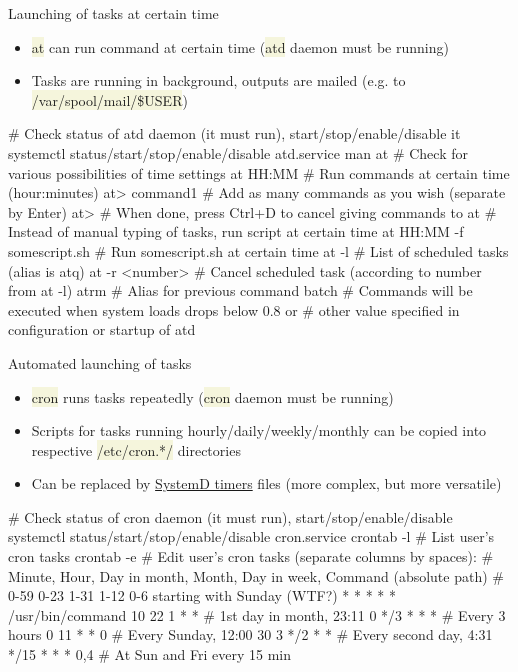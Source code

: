 \documentclass[compress, xelatex, 11pt, xcolor=svgnames, aspectratio=169, url={hyphens, lowtilde}]{beamer}
\renewcommand{\texttt}[1]{\colorbox{Beige}{{\ttfamily #1}}}
\begin{document}
\begin{frame}[fragile]{Launching of tasks at certain time}
	\begin{itemize}
		\item \texttt{at} can run command at certain time (\texttt{atd} daemon must be running)
		\item Tasks are running in background, outputs are mailed (e.g. to \texttt{/var/spool/mail/\$USER})
	\end{itemize}
	\vfill
	\begin{bashcode}
    # Check status of atd daemon (it must run), start/stop/enable/disable it
    systemctl status/start/stop/enable/disable atd.service
    man at # Check for various possibilities of time settings
    at HH:MM # Run commands at certain time (hour:minutes)
    at> command1 # Add as many commands as you wish (separate by Enter)
    at> # When done, press Ctrl+D to cancel giving commands to at
    # Instead of manual typing of tasks, run script at certain time
    at HH:MM -f somescript.sh # Run somescript.sh at certain time
    at -l # List of scheduled tasks (alias is atq)
    at -r <number> # Cancel scheduled task (according to number from at -l)
    atrm # Alias for previous command
    batch # Commands will be executed when system loads drops below 0.8 or
          # other value specified in configuration or startup of atd
	\end{bashcode}
\end{frame}

\begin{frame}[fragile]{Automated launching of tasks}
	\begin{itemize}
		\item \texttt{cron} runs tasks repeatedly (\texttt{cron} daemon must be running)
		\item Scripts for tasks running hourly/daily/weekly/monthly can be copied into respective \texttt{/etc/cron.*/} directories
		\item Can be replaced by \href{https://www.freedesktop.org/software/systemd/man/latest/systemd.timer.html}{SystemD timers} files (more complex, but more versatile)
	\end{itemize}
	\vfill
	\begin{bashcode}
    # Check status of cron daemon (it must run), start/stop/enable/disable
    systemctl status/start/stop/enable/disable cron.service
    crontab -l # List user's cron tasks
    crontab -e # Edit user's cron tasks (separate columns by spaces):
    # Minute, Hour, Day in month, Month, Day in week, Command (absolute path)
    # 0-59    0-23  1-31          1-12   0-6 starting with Sunday (WTF?)
      *       *     *             *      *            /usr/bin/command
      10      22    1             *      *    # 1st day in month, 23:11
      0       */3   *             *      *    # Every 3 hours
      0       11    *             *      0    # Every Sunday, 12:00
      30      3     */2           *      *    # Every second day, 4:31
      */15    *     *             *      0,4  # At Sun and Fri every 15 min
	\end{bashcode}
\end{frame}
\end{document}

